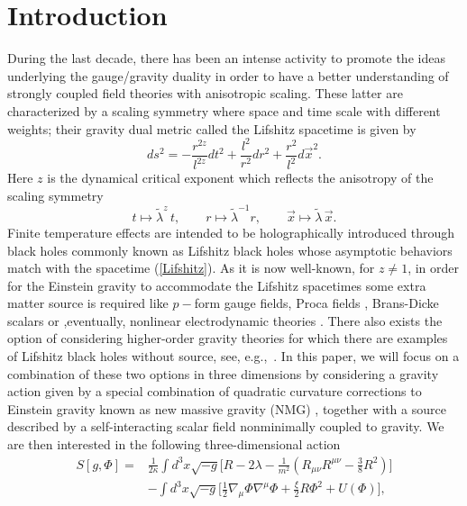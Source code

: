 \documentclass[prd,twocolumn,superscriptaddress,amsmath,amssymb,nofootinbib]{revtex4-1}
\begin{document}
\maketitle

\section{Introduction}

During the last decade, there has been an intense activity to
promote the ideas underlying the gauge/gravity duality
\cite{Maldacena:1997re} in order to have a better understanding
of strongly coupled field theories with anisotropic scaling.
These latter are characterized by a scaling symmetry where
space and  time scale with different weights; their gravity
dual metric called the Lifshitz spacetime \cite{Kachru:2008yh}
is given by
\begin{equation}
ds^{2}=-\frac{r^{2z}}{l^{2z}}dt^2+\frac{l^2}{r^2}dr^2
+\frac{r^2}{l^2}d\vec{x}^2.\label{Lifshitz}
\end{equation}
Here $z$ is the dynamical critical exponent which reflects the
anisotropy of the scaling symmetry
\[
t\mapsto\tilde{\lambda}^z\,t,\qquad
r\mapsto\tilde{\lambda}^{-1}r,\qquad
\vec{x}\mapsto\tilde{\lambda}\,\vec{x}.
\]
Finite temperature effects are intended to be holographically
introduced through black holes commonly known as Lifshitz black
holes whose asymptotic behaviors match with the spacetime
(\ref{Lifshitz}). As it is now well-known, for $z\not=1$, in
order for the Einstein gravity to accommodate the Lifshitz
spacetimes some extra matter source is required like $p-$form
gauge fields, Proca fields
\cite{Kachru:2008yh,Taylor:2008tg,Pang:2009pd}, Brans-Dicke
scalars \cite{Maeda:2011jj} or ,eventually, nonlinear
electrodynamic theories \cite{Alvarez:2014pra}. There also
exists the option of considering higher-order gravity theories
for which there are examples of Lifshitz black holes without
source, see,
e.g.,~\cite{AyonBeato:2009nh,Cai:2009ac,AyonBeato:2010tm,%
Matulich:2011ct,Oliva:2012zs,Giacomini:2012hg}. In this paper,
we will focus on a combination of these two options in three
dimensions by considering a gravity action given by a special
combination of quadratic curvature corrections to Einstein
gravity known as new massive gravity (NMG)
\cite{Bergshoeff:2009hq}, together with a source described by a
self-interacting scalar field nonminimally coupled to gravity.
We are then interested in the following three-dimensional
action {\small
\begin{align}
S[g,\Phi]={}&\frac{1}{2\kappa}\int\!\!d^{3}x\sqrt{-g}\Biggl[ R-2\lambda
-\frac{1}{m^{2}} \left( R_{\mu \nu }R^{\mu
\nu}-\frac{3}{8}R^{2}\right)  \Biggr]\nonumber\\
&-\int\!\!d^{3}x\sqrt{-g}\Biggl[
\frac{1}{2}\nabla_{\mu}\Phi\nabla^{\mu}\Phi+\frac{\xi}{2}R\Phi^2+U(\Phi)
\Biggr],
\label{action}
\end{align}}%
\end{document}
